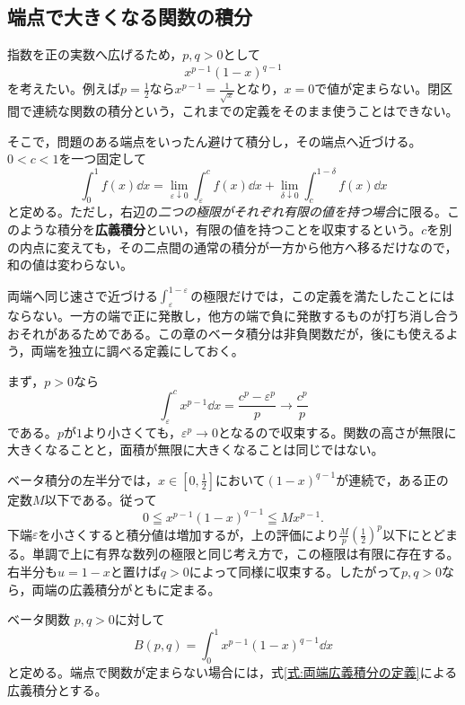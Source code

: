 \subsection{端点で大きくなる関数の積分}

指数を正の実数へ広げるため，$p,q>0$として
\[
 x^{p-1}(1-x)^{q-1}
\]
を考えたい。例えば$p=\frac12$なら$x^{p-1}=\frac1{\sqrt x}$となり，$x=0$で値が定まらない。閉区間で連続な関数の積分という，これまでの定義をそのまま使うことはできない。

そこで，問題のある端点をいったん避けて積分し，その端点へ近づける。$0<c<1$を一つ固定して
\begin{equation}\label{式:両端広義積分の定義}
 \int_0^1 f(x)\dd x
 =\lim_{\varepsilon\downarrow0}\int_{\varepsilon}^{c}f(x)\dd x
  +\lim_{\delta\downarrow0}\int_c^{1-\delta}f(x)\dd x
\end{equation}
と定める。ただし，右辺の\emph{二つの極限がそれぞれ有限の値を持つ場合}に限る。このような積分を\textbf{広義積分}といい，有限の値を持つことを収束するという。$c$を別の内点に変えても，その二点間の通常の積分が一方から他方へ移るだけなので，和の値は変わらない。

両端へ同じ速さで近づける$\int_{\varepsilon}^{1-\varepsilon}$の極限だけでは，この定義を満たしたことにはならない。一方の端で正に発散し，他方の端で負に発散するものが打ち消し合うおそれがあるためである。この章のベータ積分は非負関数だが，後にも使えるよう，両端を独立に調べる定義にしておく。

まず，$p>0$なら
\[
 \int_{\varepsilon}^{c}x^{p-1}\dd x
 =\frac{c^p-\varepsilon^p}{p}
 \longrightarrow\frac{c^p}{p}
\]
である。$p$が$1$より小さくても，$\varepsilon^p\to0$となるので収束する。関数の高さが無限に大きくなることと，面積が無限に大きくなることは同じではない。

ベータ積分の左半分では，$x\in\left[0,\frac12\right]$において$(1-x)^{q-1}$が連続で，ある正の定数$M$以下である。従って
\[
 0\leqq x^{p-1}(1-x)^{q-1}\leqq Mx^{p-1}.
\]
下端$\varepsilon$を小さくすると積分値は増加するが，上の評価により$\frac{M}{p}\left(\frac12\right)^p$以下にとどまる。単調で上に有界な数列の極限と同じ考え方で，この極限は有限に存在する。右半分も$u=1-x$と置けば$q>0$によって同様に収束する。したがって$p,q>0$なら，両端の広義積分がともに定まる。

\begin{definition}{ベータ関数}
$p,q>0$に対して
\begin{equation}\label{式:ベータ関数の定義}
 B(p,q)=\int_0^1x^{p-1}(1-x)^{q-1}\dd x
\end{equation}
と定める。端点で関数が定まらない場合には，式\eqref{式:両端広義積分の定義}による広義積分とする。
\end{definition}

